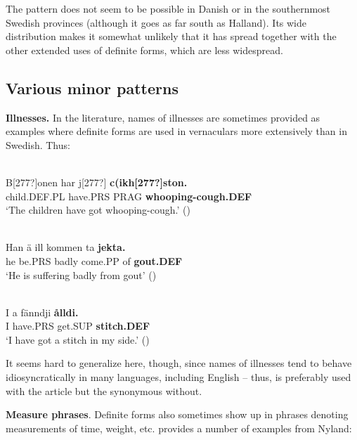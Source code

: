 \z

The pattern does not seem to be possible in Danish or in the southernmost Swedish provinces (although it goes as far south as Halland). Its wide distribution makes it somewhat unlikely that it has spread together with the other extended uses of definite forms, which are less widespread. 

\subsection{ Various minor patterns}

\textbf{Illnesses.} In the literature, names of illnesses are sometimes provided as examples where definite forms are used in vernaculars more extensively than in Swedish. Thus: 

\ea \label{} 
\\
\gll B[277?]onen  har  j[277?]  \textbf{c(ikh[277?]ston.}\\
child.DEF.PL  have.PRS  PRAG  \textbf{whooping-cough.DEF}\\
\glt ‘The children have got whooping-cough.’ (\citet[11]{Lundström1939})

\z

\ea \label{} 
\\
\gll Han  ä  ill  kommen  ta  \textbf{jekta.}\\
he  be.PRS  badly  come.PP  of  \textbf{gout.DEF}\\
  ‘He is suffering badly from gout’ (\citet{Broberg1936})
\z 
  
\ea \label{} 
\\
\gll I  a  fänndji  \textbf{ålldi.} \\
I  have.PRS  get.SUP  \textbf{stitch.DEF} \\
\glt ‘I have got a stitch in my side.’ (\citet[285]{AnderssonEtAl1999})

\z

It seems hard to generalize here, though, since names of illnesses tend to behave idiosyncratically in many languages, including English – thus,  is preferably used with the article but the synonymous  without.

\textbf{Measure phrases}. Definite forms also sometimes show up in phrases denoting measurements of time, weight, etc. \citet[9]{Lundström1939} provides a number of examples from Nyland: 

